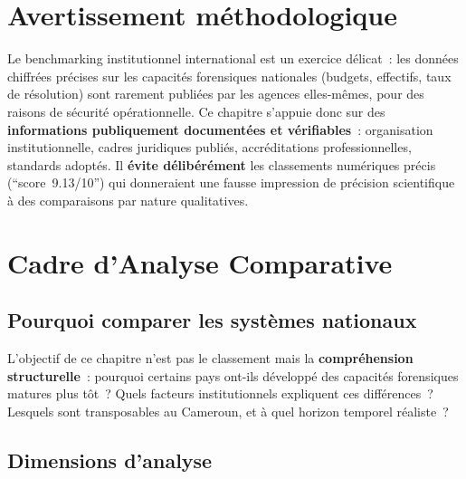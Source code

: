 \section*{Avertissement méthodologique}

Le benchmarking institutionnel international est un exercice délicat~:
les données chiffrées précises sur les capacités forensiques nationales
(budgets, effectifs, taux de résolution) sont rarement publiées par les
agences elles-mêmes, pour des raisons de sécurité opérationnelle.
Ce chapitre s'appuie donc sur des \textbf{informations publiquement
documentées et vérifiables}~: organisation institutionnelle, cadres
juridiques publiés, accréditations professionnelles, standards
adoptés. Il \textbf{évite délibérément} les classements numériques
précis (``score~9.13/10'') qui donneraient une fausse impression
de précision scientifique à des comparaisons par nature qualitatives.

\separateur

\section{Cadre d'Analyse Comparative}
\label{sec:cadre-analyse}

\subsection{Pourquoi comparer les systèmes nationaux}

L'objectif de ce chapitre n'est pas le classement mais la
\textbf{compréhension structurelle}~: pourquoi certains pays ont-ils
développé des capacités forensiques matures plus tôt~? Quels facteurs
institutionnels expliquent ces différences~? Lesquels sont transposables
au Cameroun, et à quel horizon temporel réaliste~?

\subsection{Dimensions d'analyse}

